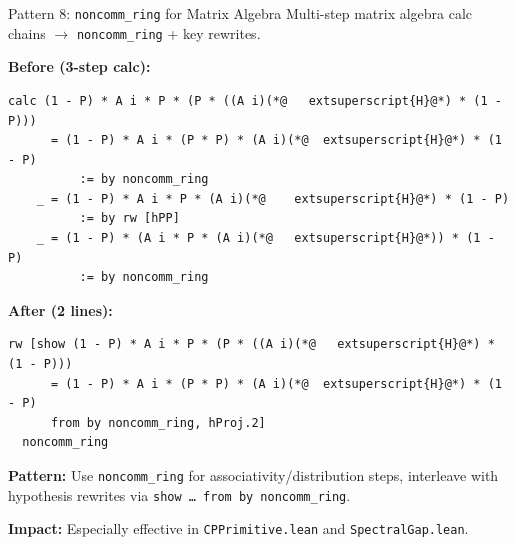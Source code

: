 \documentclass[aspectratio=169,10pt]{beamer}
\begin{document}
\begin{frame}[fragile,shrink=3]{Pattern 8: \texttt{noncomm\_ring} for Matrix Algebra}
    \vspace{-0.3em}
    Multi-step matrix algebra calc chains $\to$ \texttt{noncomm\_ring} + key rewrites.

    \vspace{0.3em}
    \textbf{\textcolor{softred}{Before} (3-step calc):}
    \begin{lstlisting}[basicstyle=\ttfamily\fontsize{6pt}{7.5pt}\selectfont\color{white}]
  calc (1 - P) * A i * P * (P * ((A i)(*@	extsuperscript{H}@*) * (1 - P)))
      = (1 - P) * A i * (P * P) * (A i)(*@	extsuperscript{H}@*) * (1 - P)
          := by noncomm_ring
    _ = (1 - P) * A i * P * (A i)(*@	extsuperscript{H}@*) * (1 - P)
          := by rw [hPP]
    _ = (1 - P) * (A i * P * (A i)(*@	extsuperscript{H}@*)) * (1 - P)
          := by noncomm_ring
    \end{lstlisting}

    \textbf{\textcolor{leangreen}{After} (2 lines):}
    \begin{lstlisting}[basicstyle=\ttfamily\fontsize{6pt}{7.5pt}\selectfont\color{white}]
  rw [show (1 - P) * A i * P * (P * ((A i)(*@	extsuperscript{H}@*) * (1 - P)))
      = (1 - P) * A i * (P * P) * (A i)(*@	extsuperscript{H}@*) * (1 - P)
      from by noncomm_ring, hProj.2]
  noncomm_ring
    \end{lstlisting}

    \vspace{0.3em}
    {\small
    \textbf{Pattern:}
    Use \texttt{noncomm\_ring} for associativity/distribution steps,
    interleave with hypothesis rewrites via \texttt{show \ldots\ from by noncomm\_ring}.

    \vspace{0.2em}
    \textbf{Impact:} Especially effective in \texttt{CPPrimitive.lean} and \texttt{SpectralGap.lean}.
    }
\end{frame}

\end{document}
